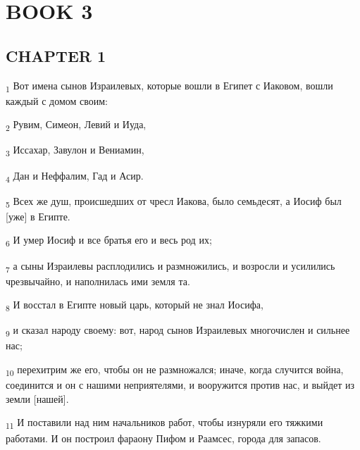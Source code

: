 \section{BOOK 3}
\subsection{CHAPTER 1}
\begin{tcolorbox}
\textsubscript{1} Вот имена сынов Израилевых, которые вошли в Египет с Иаковом, вошли каждый с домом своим:
\end{tcolorbox}
\begin{tcolorbox}
\textsubscript{2} Рувим, Симеон, Левий и Иуда,
\end{tcolorbox}
\begin{tcolorbox}
\textsubscript{3} Иссахар, Завулон и Вениамин,
\end{tcolorbox}
\begin{tcolorbox}
\textsubscript{4} Дан и Неффалим, Гад и Асир.
\end{tcolorbox}
\begin{tcolorbox}
\textsubscript{5} Всех же душ, происшедших от чресл Иакова, было семьдесят, а Иосиф был [уже] в Египте.
\end{tcolorbox}
\begin{tcolorbox}
\textsubscript{6} И умер Иосиф и все братья его и весь род их;
\end{tcolorbox}
\begin{tcolorbox}
\textsubscript{7} а сыны Израилевы расплодились и размножились, и возросли и усилились чрезвычайно, и наполнилась ими земля та.
\end{tcolorbox}
\begin{tcolorbox}
\textsubscript{8} И восстал в Египте новый царь, который не знал Иосифа,
\end{tcolorbox}
\begin{tcolorbox}
\textsubscript{9} и сказал народу своему: вот, народ сынов Израилевых многочислен и сильнее нас;
\end{tcolorbox}
\begin{tcolorbox}
\textsubscript{10} перехитрим же его, чтобы он не размножался; иначе, когда случится война, соединится и он с нашими неприятелями, и вооружится против нас, и выйдет из земли [нашей].
\end{tcolorbox}
\begin{tcolorbox}
\textsubscript{11} И поставили над ним начальников работ, чтобы изнуряли его тяжкими работами. И он построил фараону Пифом и Раамсес, города для запасов.
\end{tcolorbox}
